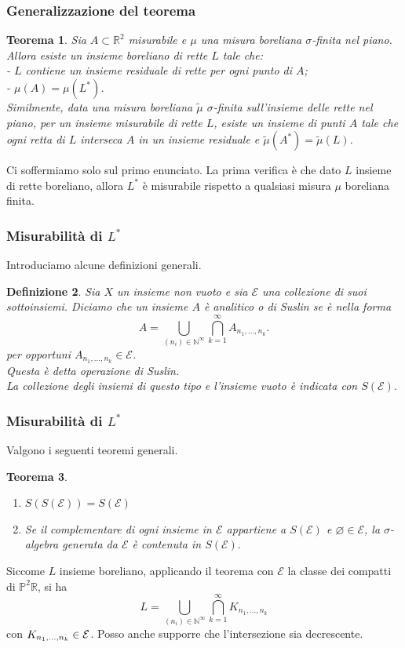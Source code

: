 \documentclass[11pt]{beamer} %
\newcommand{\R}{\mathbb{R}}
\newcommand{\N}{\mathbb{N}}
\renewcommand{\P}{\mathbb{P}}
\newcommand{\E}{\mathcal{E}}
\newcommand{\<}{\langle}
\renewcommand{\>}{\rangle}
\theoremstyle{theorem}
\newtheorem{teo}{Teorema}
\theoremstyle{theorem}
\theoremstyle{theorem}
\theoremstyle{theorem}
\newtheorem{defin}[teo]{Definizione}
\theoremstyle{theorem}
\begin{document}
\begin{frame}
	\frametitle{Generalizzazione del teorema}
	
	\begin{teo}
		Sia $A \subset \mathbb{R}^{2}$ misurabile e $\mu$ una misura boreliana $\sigma$-finita nel piano. Allora esiste un insieme boreliano di rette $L$ tale che: \\
		- $L$ contiene un insieme residuale di rette per ogni punto di $A$;\\
		- $\mu(A)=\mu(L^*)$. \\ \pause
		Similmente, data una misura boreliana $\tilde \mu$ $\sigma$-finita sull'insieme delle rette nel piano, per un insieme misurabile di rette $L$, esiste un insieme di punti $A$ tale che ogni retta di $L$ interseca $A$ in un insieme residuale e $\tilde \mu(A^*)=\tilde \mu(L)$.
	\end{teo}
	\pause
	Ci soffermiamo solo sul primo enunciato. La prima verifica è che dato $L$ insieme di rette boreliano, allora $L^*$ è misurabile rispetto a qualsiasi misura $\mu$ boreliana finita.
\end{frame}

\begin{frame}
	\frametitle{Misurabilità di $L^*$}
	Introduciamo alcune definizioni generali.

\begin{defin}
	Sia $X$ un insieme non vuoto e sia $\mathcal{E}$ una collezione di suoi sottoinsiemi. \pause Diciamo che un insieme $A$ è analitico o di Suslin se è nella forma
	$$
	A=\bigcup_{\left(n_{i}\right) \in \mathbb{N}^{\infty}} \bigcap_{k=1}^{\infty} A_{n_{1}, \ldots, n_{k}} .
	$$
	per opportuni $A_{n_{1}, \ldots, n_{k}} \in \E$.\\ \pause
	Questa è detta operazione di Suslin.\\
	La collezione degli insiemi di questo tipo e l'insieme vuoto è indicata con $S(\mathcal{E})$.
\end{defin}	

\end{frame}

\begin{frame}[fragile]
\frametitle{Misurabilità di $L^*$}	
Valgono i seguenti teoremi generali. \pause

\begin{teo}
	\begin{enumerate}[i]
		\item $S(S(\mathcal{E}))=S(\mathcal{E})$\\ \pause
		\item Se il complementare di ogni insieme in $\E$ appartiene a $S(\E)$ e $\varnothing \in \E$, la $\sigma$-algebra generata da $\mathcal{E}$ è contenuta in $S(\mathcal{E}).$
	\end{enumerate}
\end{teo}
\pause
Siccome $L$ insieme boreliano, applicando il teorema con $\E$ la classe dei compatti di $\P^2 \R$, si ha
$$L=\bigcup_{{(n_i)}\in{\N}^\infty}\bigcap_{k=1}^\infty K_{n_1,\ldots,n_k}$$
con $K_{n_1,\ldots,n_k}\in {\cal E}$. Posso anche supporre che l'intersezione sia decrescente.

\end{frame}
\end{document}

